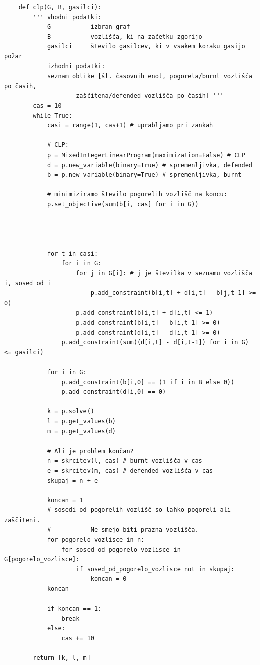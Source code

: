 \documentclass[a4paper, 12pt]{article}
\begin{document}
\begin{scriptsize}
\begin{verbatim}
    def clp(G, B, gasilci):
        ''' vhodni podatki:
            G           izbran graf
            B           vozlišča, ki na začetku zgorijo
            gasilci     število gasilcev, ki v vsakem koraku gasijo požar
            izhodni podatki:
            seznam oblike [št. časovnih enot, pogorela/burnt vozlišča po časih, 
                    zaščitena/defended vozlišča po časih] '''
        cas = 10
        while True:
            casi = range(1, cas+1) # uprabljamo pri zankah
        
            # CLP:
            p = MixedIntegerLinearProgram(maximization=False) # CLP
            d = p.new_variable(binary=True) # spremenljivka, defended
            b = p.new_variable(binary=True) # spremenljivka, burnt

            # minimiziramo število pogorelih vozlišč na koncu:
            p.set_objective(sum(b[i, cas] for i in G)) 




            for t in casi:
                for i in G:
                    for j in G[i]: # j je številka v seznamu vozlišča i, sosed od i
                        p.add_constraint(b[i,t] + d[i,t] - b[j,t-1] >= 0)
                    p.add_constraint(b[i,t] + d[i,t] <= 1)
                    p.add_constraint(b[i,t] - b[i,t-1] >= 0)
                    p.add_constraint(d[i,t] - d[i,t-1] >= 0)
                p.add_constraint(sum((d[i,t] - d[i,t-1]) for i in G) <= gasilci)

            for i in G:
                p.add_constraint(b[i,0] == (1 if i in B else 0))
                p.add_constraint(d[i,0] == 0)
                
            k = p.solve()
            l = p.get_values(b)
            m = p.get_values(d)
            
            # Ali je problem končan?
            n = skrcitev(l, cas) # burnt vozlišča v cas
            e = skrcitev(m, cas) # defended vozlišča v cas
            skupaj = n + e
            
            koncan = 1
            # sosedi od pogorelih vozlišč so lahko pogoreli ali zaščiteni. 
            #           Ne smejo biti prazna vozlišča.
            for pogorelo_vozlisce in n:
                for sosed_od_pogorelo_vozlisce in G[pogorelo_vozlisce]:
                    if sosed_od_pogorelo_vozlisce not in skupaj:
                        koncan = 0
            koncan
            
            if koncan == 1:
                break
            else:
                cas += 10
            
        return [k, l, m]\end{verbatim}
\end{scriptsize}
\end{document}
